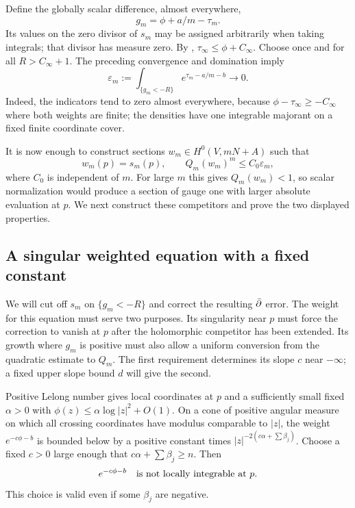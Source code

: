 Define the globally scalar difference, almost everywhere,
\[
 g_m=\phi+a/m-\tau_m.
\]
Its values on the zero divisor of $s_m$ may be assigned arbitrarily
when taking integrals; that divisor has measure zero.
By ,
$\tau_\infty\le\phi+C_\infty$.  Choose once and for all
$R>C_\infty+1$.  The preceding convergence and domination imply
\begin{equation}\label{eq:extremal-tail}
 \varepsilon_m:=\int_{\{g_m<-R\}}e^{\tau_m-a/m-b}
 \longrightarrow0.
\end{equation}
Indeed, the indicators tend to zero almost everywhere, because
$\phi-\tau_\infty\ge-C_\infty$ where both weights are finite; the
densities have one integrable majorant on a fixed finite coordinate
cover.

It is now enough to construct sections $w_m\in H^0(V,mN+A)$ such that
\[
 w_m(p)=s_m(p),\qquad Q_m(w_m)^m\le C_0\varepsilon_m,
\]
where $C_0$ is independent of $m$.  For large $m$ this gives
$Q_m(w_m)<1$, so scalar normalization would produce a section of
gauge one with larger absolute evaluation at $p$.  We next construct
these competitors and prove the two displayed properties.

\subsection{A singular weighted equation with a fixed constant}

We will cut off $s_m$ on $\{g_m<-R\}$ and correct the resulting
$\bar\partial$ error.  The weight for this equation must serve two purposes.
Its singularity near $p$ must force the correction to vanish at $p$
after the holomorphic competitor has been extended.  Its growth where $g_m$
is positive must also allow a uniform conversion from the quadratic
estimate to $Q_m$.
The first requirement determines its slope $c$ near $-\infty$; a fixed
upper slope bound $d$ will give the second.

Positive Lelong number gives local coordinates at $p$ and a sufficiently
small fixed $\alpha>0$ with
$\phi(z)\le\alpha\log|z|^2+O(1)$.  On a cone of positive angular
measure on which all crossing coordinates have modulus comparable to
$|z|$, the weight $e^{-c\phi-b}$ is bounded below by a positive
constant times
$|z|^{-2(c\alpha+\sum\beta_j)}$.  Choose a fixed $c>0$ large enough
that $c\alpha+\sum\beta_j\ge n$.  Then
\begin{equation}\label{eq:nonintegrable-weight}
 e^{-c\phi-b}\quad\hbox{is not locally integrable at }p.
\end{equation}
This choice is valid even if some $\beta_j$ are negative.

